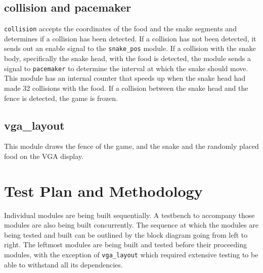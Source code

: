 \documentclass[paper=usletter, fontsize=12pt]{article}
\begin{document}
        \subsection{collision and pacemaker}
        \texttt{collision} accepts the coordinates of the food and the snake segments and determines if a collision has been detected. If a collision has not been detected, it sends out an enable signal to the \texttt{snake\_pos} module. If a collision with the snake body, specifically the snake head, with the food is detected, the module sends a signal to \texttt{pacemaker} to determine the interval at which the snake should move. This module has an internal counter that speeds up when the snake head had made 32 collisions with the food. If a collision between the snake head and the fence is detected, the game is frozen.

        \subsection{vga\_layout}
        This module draws the fence of the game, and the snake and the randomly placed food on the VGA display.

    \section{Test Plan and Methodology}
    Individual modules are being built sequentially. A testbench to accompany those modules are also being built concurrently. The sequence at which the modules are being tested and built can be outlined by the block diagram going from left to right. The leftmost modules are being built and tested before their proceeding modules, with the exception of \texttt{vga\_layout} which required extensive testing to be able to withstand all its dependencies.


\end{document}
